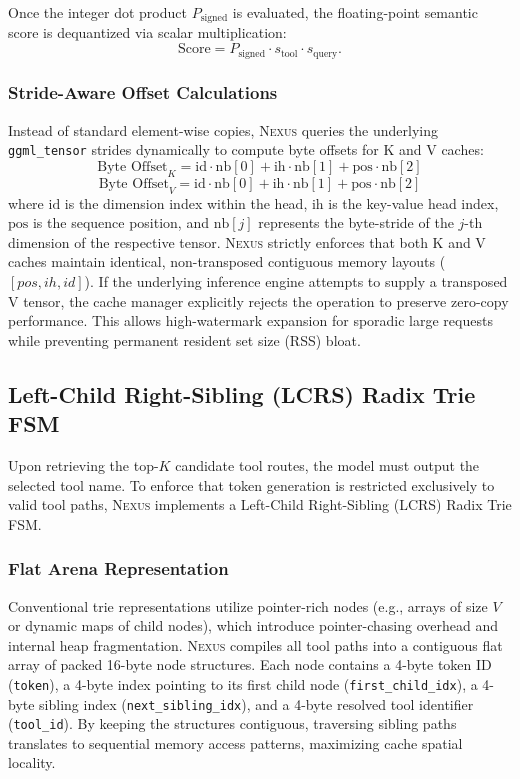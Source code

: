 \documentclass[conference,10pt]{IEEEtran}
\newcommand{\Nexus}{\textsc{Nexus}\xspace}
\begin{document}
Once the integer dot product $P_{\text{signed}}$ is evaluated, the floating-point semantic score is dequantized via scalar multiplication:
\begin{equation}
\text{Score} = P_{\text{signed}} \cdot s_{\text{tool}} \cdot s_{\text{query}}.
\end{equation}

\subsubsection{Stride-Aware Offset Calculations}
Instead of standard element-wise copies, \Nexus queries the underlying \texttt{ggml\_tensor} strides dynamically to compute byte offsets for K and V caches:
\begin{equation}
\text{Byte Offset}_K = \text{id} \cdot \text{nb}[0] + \text{ih} \cdot \text{nb}[1] + \text{pos} \cdot \text{nb}[2]
\end{equation}
\begin{equation}
\text{Byte Offset}_V = \text{id} \cdot \text{nb}[0] + \text{ih} \cdot \text{nb}[1] + \text{pos} \cdot \text{nb}[2]
\end{equation}
where $\text{id}$ is the dimension index within the head, $\text{ih}$ is the key-value head index, $\text{pos}$ is the sequence position, and $\text{nb}[j]$ represents the byte-stride of the $j$-th dimension of the respective tensor. \Nexus strictly enforces that both K and V caches maintain identical, non-transposed contiguous memory layouts ($[pos, ih, id]$). If the underlying inference engine attempts to supply a transposed V tensor, the cache manager explicitly rejects the operation to preserve zero-copy performance.
This allows high-watermark expansion for sporadic large requests while preventing permanent resident set size (RSS) bloat.

\subsection{Left-Child Right-Sibling (LCRS) Radix Trie FSM}
\label{subsec:arch-fsm}

Upon retrieving the top-$K$ candidate tool routes, the model must output the selected tool name. To enforce that token generation is restricted exclusively to valid tool paths, \Nexus implements a Left-Child Right-Sibling (LCRS) Radix Trie FSM.

\subsubsection{Flat Arena Representation}
Conventional trie representations utilize pointer-rich nodes (e.g., arrays of size $V$ or dynamic maps of child nodes), which introduce pointer-chasing overhead and internal heap fragmentation. \Nexus compiles all tool paths into a contiguous flat array of packed 16-byte node structures. Each node contains a 4-byte token ID (\texttt{token}), a 4-byte index pointing to its first child node (\texttt{first\_child\_idx}), a 4-byte sibling index (\texttt{next\_sibling\_idx}), and a 4-byte resolved tool identifier (\texttt{tool\_id}). By keeping the structures contiguous, traversing sibling paths translates to sequential memory access patterns, maximizing cache spatial locality.
\end{document}
